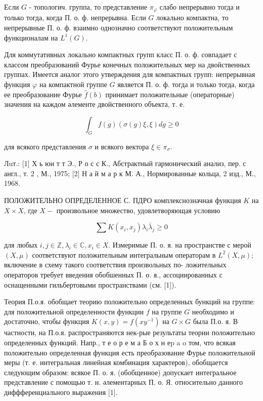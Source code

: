 \documentclass[10pt]{article}
\begin{document}
Если $G$ - топологич. группа, то представление $\pi_{\varphi}$ слабо непрерывно тогда и только тогда, когда П. о. $ф$. непрерывна. Если $G$ локально компактна, то непрерывные П. о. ф. взаимно однозначно соответствуют положительным функционалам на $L^{1}(G)$.



Для коммутативных локально компактных групп класс П. о. ф. совпадает с классом преобразований Фурье конечных положительных мер на двойственных группах. Имеется аналог этого утверждения для компактных групп: непрерывная функция $\varphi$ на компактной группе $G$ является П. о. ф. тогда и только тогда, когда ее преобразование Фурье $\hat{f}(b)$ принимает положительные (операторные) значения на каждом әлементе двойственного объекта, т. е.



\[

\int_{G} f(g)(\sigma(g) \xi, \xi) d g \geqslant 0

\]



для всякого представления $\sigma$ и всякого вектора $\xi \in \pi_{\sigma}$.



Лuт.: [1] Х ь юи т т Э., Р о с с К., Абстрактный гармонический анализ, пер. с англ., т. 2 , М., 1975; [2] Н а й м а р к М. А., Нормированные кольца, 2 изд., М., 1968.



ПОЛОЖИТЕЛЬНО ОПРЕДЕЛЕННОЕ С. ПДРО комплекснозначная функция $K$ на $X \times X$, где $X-$ произвольное множество, удовлетворяющая условию



\[

\sum K\left(x_{i}, x_{j}\right) \lambda_{i} \bar{\lambda}_{j} \geqslant 0

\]



для любых $i, j \in \mathbb{Z}, \lambda_{i} \in \mathbb{C}, x_{i} \in X$. Измеримые П. о. я. на пространстве с мерой $(X, \mu)$ соответствуют положительным интегральным операторам в $L^{2}(X, \mu) ;$ включение в схему такого соответствия произвольных по- ложительных операторов требует введения обобшенных П. о. я., ассоциированных с оснащенными гильбертовыми пространствами (см. [1]).



Теория П.о.я. обобщает теорию положительно определенных бункций на группе: для положительной определенности функции $f$ на группе $G$ необходимо и достаточно, чтобы функция $K(x, y)=f\left(x y^{-1}\right)$ на $G \times G$ была П.о. я. В частности, на П.о.я. распространяются нек-рые результаты теории положительно определенных функций. Напр., т е о р е м а Б о х н еp a o том, что всякая положительно определенная функция есть преобразование Фурье положительной меры (т. е. интегральная линейная комбинация характеров), обобщается следующим образом: всякое П. о. я. (обобщенное) допускает интегральное представление с помощью т. н. әлементарных П. о. Я. относительно данного диффференциального выражения [1].
\end{document}
